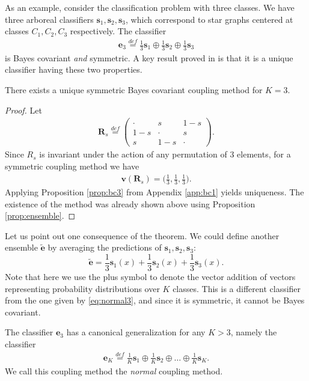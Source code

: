 As an example, consider the classification problem with three classes. We have three arboreal classifiers $\boldsymbol{s}_1, \boldsymbol{s}_2, \boldsymbol{s}_3$, which correspond to star graphs centered  at classes $C_1, C_2, C_3$ respectively. The classifier 
\begin{align}
\boldsymbol{e}_3 \stackrel{def}{=} \frac13 \boldsymbol{s}_1 \oplus \frac13 \boldsymbol{s}_2 \oplus \frac 13 \boldsymbol{s}_3  \label{eq:normal3}
\end{align}
is Bayes covariant \emph{and} symmetric. A key result proved in \cite{vsuch2016bayes} is that it is a unique  classifier having these two properties.

\begin{thm} \label{thm:K3}
	There exists a unique symmetric Bayes covariant coupling method for $K=3$.
\end{thm}

\begin{proof}
Let 
\begin{align}
	\boldsymbol{R}_s \stackrel{def}{=} \begin{pmatrix} \cdot & s & 1 -s \\  1-s & \cdot & s \\ s & 1-s & \cdot \end{pmatrix}.
\end{align}
Since $R_s$ is invariant under the action of any permutation of 3 elements, 
for a symmetric coupling method we have 
\begin{align}
	\boldsymbol{v} (\boldsymbol{R}_s) = \biggl(\frac 13, \frac 13, \frac 13 \biggr).
\end{align}
Applying  Proposition \ref{prop:bc3} from Appendix \ref{app:bc1} yields uniqueness. The existence of the method was already shown above using Proposition \ref{prop:ensemble}.
\end{proof}


Let us point out one consequence of the theorem. We could define another ensemble $\tilde{\boldsymbol{e}}$ by averaging the predictions of $\boldsymbol{s}_1, \boldsymbol{s}_2, \boldsymbol{s}_3$:
\[
\tilde{\boldsymbol{e}} = \frac13 \boldsymbol{s}_1(x) + \frac13 \boldsymbol{s}_2(x) + \frac 13 \boldsymbol{s}_3(x).
\]
Note that here we use the plus symbol to denote the vector addition of vectors representing  probability distributions over $K$ classes. This is a different classifier from the one given by  \eqref{eq:normal3}, and since it is symmetric, it cannot be Bayes covariant.

The classifier $\boldsymbol{e}_3$ has a canonical generalization for any $K>3$, namely the classifier
\begin{align}
\boldsymbol{e}_K \stackrel{def}{=} \frac1K \boldsymbol{s}_1 \oplus \frac1K \boldsymbol{s}_2 \oplus \ldots \oplus \frac 1K \boldsymbol{s}_K.  \label{eq:bc1}
\end{align}
We call this coupling method the \emph{normal} coupling method.


